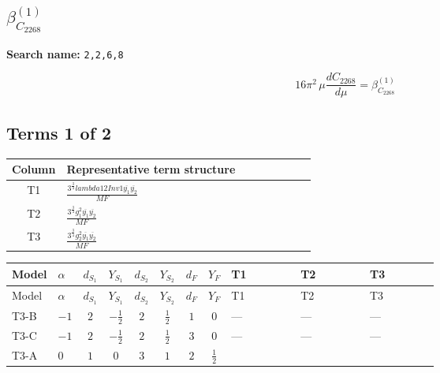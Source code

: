 \documentclass[8pt]{article}
\begin{document}
\begin{landscape}
\section*{$\beta_{C_{2268}}^{(1)}$}
\noindent\textbf{Search name: }\texttt{2,2,6,8}\par\smallskip
\[16\pi^2\,\mu\frac{d C_{2268}}{d\mu}=\beta_{C_{2268}}^{(1)}\]
\subsection*{Terms 1 of 2}
\begin{center}
\begin{tabular}{@{}c >{\raggedright\arraybackslash}p{0.82\linewidth}@{}}
\toprule
Column & Representative term structure \\
\midrule
T1 & \(\displaystyle \frac{3^{\frac{3}{4}} lambda12Inv1 \overline{y_{1}} \overline{y_{2}}}{MF}\) \\
\midrule
T2 & \(\displaystyle \frac{3^{\frac{3}{4}} g_{1}^{2} \overline{y_{1}} \overline{y_{2}}}{MF}\) \\
\midrule
T3 & \(\displaystyle \frac{3^{\frac{3}{4}} g_{2}^{2} \overline{y_{1}} \overline{y_{2}}}{MF}\) \\
\midrule
\bottomrule
\end{tabular}
\end{center}
\smallskip
\tiny
\begin{longtable}{@{}llcccccc >{\raggedright\arraybackslash}p{0.21\linewidth} >{\raggedright\arraybackslash}p{0.21\linewidth} >{\raggedright\arraybackslash}p{0.21\linewidth}@{}}
\toprule
Model & $\alpha$ & $d_{S_1}$ & $Y_{S_1}$ & $d_{S_2}$ & $Y_{S_2}$ & $d_F$ & $Y_F$ & T1 & T2 & T3 \\
\midrule
\endfirsthead
\toprule
Model & $\alpha$ & $d_{S_1}$ & $Y_{S_1}$ & $d_{S_2}$ & $Y_{S_2}$ & $d_F$ & $Y_F$ & T1 & T2 & T3 \\
\midrule
\endhead
T3-B & $-1$ & $2$ & $-\frac{1}{2}$ & $2$ & $\frac{1}{2}$ & $1$ & $0$ & --- & --- & --- \\
\midrule
T3-C & $-1$ & $2$ & $-\frac{1}{2}$ & $2$ & $\frac{1}{2}$ & $3$ & $0$ & --- & --- & --- \\
\midrule
T3-A & $0$ & $1$ & $0$ & $3$ & $1$ & $2$ & $\frac{1}{2}$ & \scriptsize\adjustbox{max width=\linewidth}{$\begin{gathered} \frac{3^{\frac{3}{4}} lambda12Inv1 \overline{y_{1}} \overline{y_{2}}}{6 MF}\end{gathered}$} & \scriptsize\adjustbox{max width=\linewidth}{$\begin{gathered} \frac{3^{\frac{3}{4}} g_{1}^{2} \overline{y_{1}} \overline{y_{2}}}{8 MF}\end{gathered}$} & \scriptsize\adjustbox{max width=\linewidth}{$\begin{gathered} \frac{17 \cdot 3^{\frac{3}{4}} g_{2}^{2} \overline{y_{1}} \overline{y_{2}}}{24 MF}\end{gathered}$} \\

\end{longtable}
\end{landscape}
\end{document}
